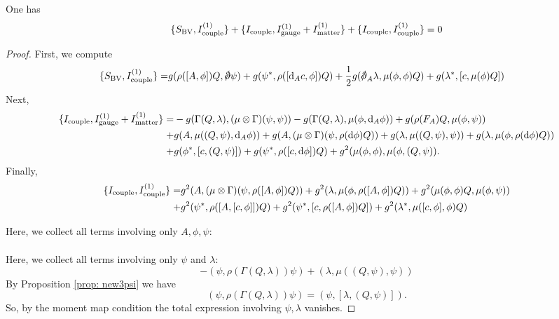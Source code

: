 \documentclass[10pt, oneside]{article}
\begin{document}
\begin{lem} One has
\[
\{S_{\rm BV} , I^{(1)}_{\rm couple}\} + \{I_{\rm couple}, I^{(1)}_{\rm gauge} + I^{(1)}_{\rm matter}\} + \{I_{\rm couple}, I^{(1)}_{\rm couple}\}  =  0 
\]
\end{lem}
\begin{proof}
First, we compute
\begin{align*}
\{S_{\rm BV} , I^{(1)}_{\rm couple}\} = & g (\rho([A, \phi]) Q, \sd \dd \psi) + g (\psi^*, \rho([\d_A c, \phi]) Q) + \frac{1}{2} g (\sd \dd_A \lambda, \mu(\phi, \phi) Q) + g (\lambda^*, [c, \mu(\phi) Q]) 
\end{align*}
Next,
\begin{align*}
\{I_{\rm couple} , I^{(1)}_{\rm gauge} + I^{(1)}_{\rm matter}\} = & - g (\Gamma(Q, \lambda), (\mu \otimes \Gamma)(\psi,\psi)) - g (\Gamma(Q, \lambda), \mu(\phi, {\rm d}_A \phi)) + g (\rho(F_A)Q , \mu(\phi, \psi)) \\ + & g (A, \mu((Q, \psi), {\rm d}_A \phi)) + g (A, (\mu \otimes \Gamma)(\psi, \rho({\rm d} \phi) Q)) + g (\lambda, \mu((Q, \psi), \psi)) + g (\lambda, \mu(\phi, \rho({\rm d} \phi)  Q)) \\ + & g (\phi^*, [c, (Q,\psi)])  + g (\psi^*, \rho( [c ,{\rm d} \phi ]) Q) + g^2 (\mu(\phi, \phi) , \mu(\phi, (Q, \psi)) . 
\end{align*}
Finally,
\begin{align*}
\{I_{\rm couple}, I^{(1)}_{\rm couple}\} = & g^2 (A, (\mu \otimes \Gamma)(\psi, \rho([A, \phi]) Q)) + g^2 (\lambda, \mu(\phi, \rho([A, \phi]) Q)) + g^2 (\mu(\phi, \phi)Q , \mu(\phi, \psi)) \\
+ &g^2 (\psi^*, \rho([A, [c,\phi]]) Q) + g^2 (\psi^*, [c, \rho([A,\phi])Q]) + g^2 (\lambda^*, \mu([c,\phi], \phi) Q)  
\end{align*}

Here, we collect all terms involving only $A, \phi, \psi$:
\begin{align*}
& 
\end{align*} 

Here, we collect all terms involving only $\psi$ and $\lambda$:
\[
- (\psi, \rho(\Gamma(Q, \lambda)) \psi) + (\lambda, \mu((Q,\psi), \psi))
\]
By Proposition \ref{prop: new3psi} we have
\[
(\psi, \rho(\Gamma(Q, \lambda)) \psi) = (\psi, [\lambda, (Q, \psi)] ) .
\]
So, by the moment map condition the total expression involving $\psi, \lambda$ vanishes. 


\end{proof}
\end{document}
